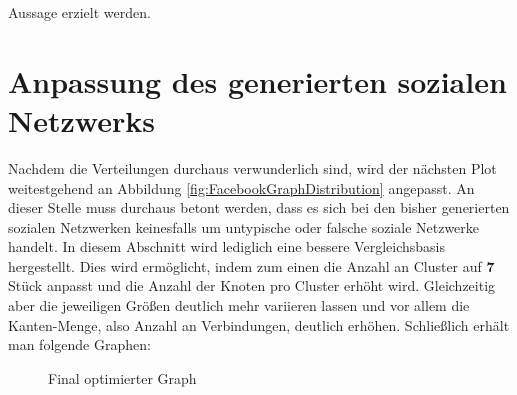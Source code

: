 Aussage erzielt werden. 


\section{Anpassung des generierten sozialen Netzwerks}
Nachdem die Verteilungen durchaus verwunderlich sind, wird der nächsten Plot weitestgehend an Abbildung \ref{fig:FacebookGraphDistribution} angepasst. An dieser Stelle muss durchaus betont werden, dass es sich bei den bisher generierten sozialen Netzwerken keinesfalls um untypische oder falsche soziale Netzwerke handelt. In diesem Abschnitt wird lediglich eine bessere Vergleichsbasis hergestellt. Dies wird ermöglicht, indem zum einen die Anzahl an Cluster auf \textbf{7} Stück anpasst und die Anzahl der Knoten pro Cluster erhöht wird. Gleichzeitig aber die jeweiligen Größen deutlich mehr variieren lassen und vor allem die Kanten-Menge, also Anzahl an Verbindungen, deutlich erhöhen. Schließlich erhält man folgende Graphen: 

\FloatBarrier
\begin{figure}[h!]%
  \centering
  \qquad
  \caption{Final optimierter Graph}
  \label{fig:ourGraphFinalPlot}
\end{figure}
\FloatBarrier

